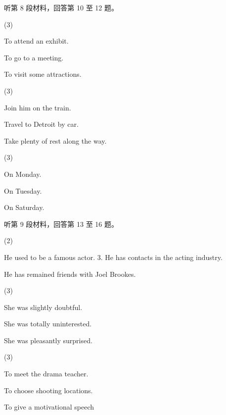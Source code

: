\documentclass{英语试卷}
\begin{document}
\par 听第 8 段材料，回答第 10 至 12 题。\par
{}
\begin{choices}(3)
  \item To attend an exhibit.
  \item To go to a meeting.
  \item To visit some attractions.
\end{choices}
\begin{choices}(3)
  \item Join him on the train.
  \item Travel to Detroit by car.
  \item Take plenty of rest along the way.
\end{choices}
\begin{choices}(3)
  \item On Monday.
  \item On Tuesday.
  \item On Saturday.
\end{choices}
\par 听第 9 段材料，回答第 13 至 16 题。\par
{}
\begin{choices}(2)
  \item He used to be a famous actor. 3. He has contacts in the acting industry.
  \item He has remained friends with Joel Brookes.
\end{choices}
\begin{choices}(3)
  \item She was slightly doubtful.
  \item She was totally uninterested.
  \item She was pleasantly surprised.
\end{choices}
\begin{choices}(3)
  \item To meet the drama teacher.
  \item To choose shooting locations.
  \item To give a motivational speech
\end{choices}
\end{document}
